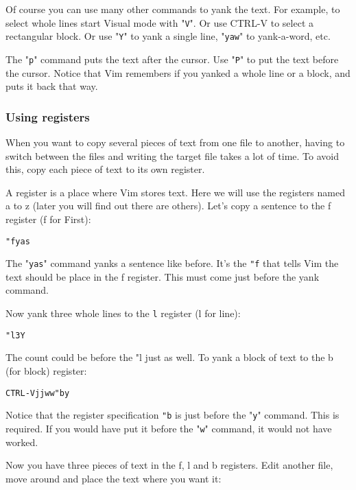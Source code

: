 Of course you can use many other commands to yank the text.
For example, to select whole lines start Visual mode with "\texttt{V}".
Or use CTRL-V to select a rectangular block.
Or use "\texttt{Y}" to yank a single line, "\texttt{yaw}" to yank-a-word, etc.

The "\texttt{p}" command puts the text after the cursor.
Use "\texttt{P}" to put the text before the cursor.
Notice that Vim remembers if you yanked a whole line or a block, and puts it back that way.

\subsubsection{Using registers}
When you want to copy several pieces of text from one file to another, having to switch between the files and writing the target file takes a lot of time.
To avoid this, copy each piece of text to its own register.

A register is a place where Vim stores text.
Here we will use the registers named a to z (later you will find out there are others).
Let's copy a sentence to the f register (f for First):

 \begin{Verbatim}[samepage=true]
 "fyas
 \end{Verbatim}

The "\texttt{yas}" command yanks a sentence like before.
It's the \texttt{"f} that tells Vim the text should be place in the f register.
This must come just before the yank command.

Now yank three whole lines to the \texttt{l} register (l for line):

 \begin{Verbatim}[samepage=true]
 "l3Y
 \end{Verbatim}

The count could be before the "l just as well.
To yank a block of text to the b (for block) register:

 \begin{Verbatim}[samepage=true]
 CTRL-Vjjww"by
 \end{Verbatim}

Notice that the register specification \texttt{"b} is just before the "\texttt{y}" command.
This is required.
If you would have put it before the "\texttt{w}" command, it would not have worked.

Now you have three pieces of text in the f, l and b registers.
Edit another file, move around and place the text where you want it:

